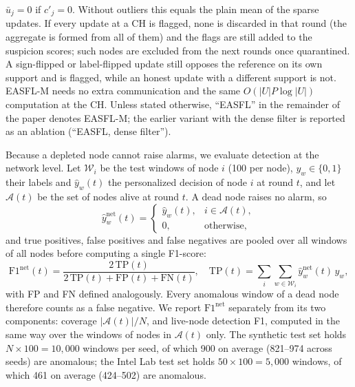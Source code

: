 $\bar u_j=0$ if $c'_j=0$. Without outliers this equals the plain mean of the sparse
updates. If every update at a CH is flagged, none is discarded in that round (the
aggregate is formed from all of them) and the flags are still added to the suspicion
scores; such nodes are excluded from the next rounds once quarantined. A sign-flipped or
label-flipped update still opposes the reference on its own support and is flagged,
while an honest update with a different support is not. EASFL-M needs no extra
communication and the same $O(|U|P\log|U|)$ computation at the CH. Unless stated
otherwise, ``EASFL'' in the remainder of the paper denotes EASFL-M; the earlier variant
with the dense filter is reported as an ablation (``EASFL, dense filter'').

Because a depleted node cannot raise alarms, we evaluate detection at the network level.
Let $\mathcal{W}_i$ be the test windows of node $i$ (100 per node), $y_w\in\{0,1\}$ their
labels and $\hat y_w(t)$ the personalized decision of node $i$ at round $t$, and let
$\mathcal{A}(t)$ be the set of nodes alive at round $t$. A dead node raises no alarm, so
\begin{equation}
\hat y^{\mathrm{net}}_w(t)=\begin{cases}\hat y_w(t), & i\in\mathcal{A}(t),\\0,&\text{otherwise,}\end{cases}
\end{equation}
and true positives, false positives and false negatives are pooled over all windows of
all nodes before computing a single F1-score:
\begin{equation}
\mathrm{F1}^{\mathrm{net}}(t)=\frac{2\,\mathrm{TP}(t)}{2\,\mathrm{TP}(t)+\mathrm{FP}(t)+\mathrm{FN}(t)},\quad
\mathrm{TP}(t)=\sum_{i}\sum_{w\in\mathcal{W}_i}\hat y^{\mathrm{net}}_w(t)\,y_w,
\end{equation}
with FP and FN defined analogously. Every anomalous window of a dead node therefore counts
as a false negative. We report $\mathrm{F1}^{\mathrm{net}}$ separately from its two
components: coverage $|\mathcal{A}(t)|/N$, and live-node detection F1, computed in the
same way over the windows of nodes in $\mathcal{A}(t)$ only. The synthetic test set holds
$N\times100=10{,}000$ windows per seed, of which 900 on average (821--974 across seeds) are anomalous; the
Intel Lab test set holds $50\times100=5{,}000$ windows, of which 461 on average (424--502) are anomalous.

